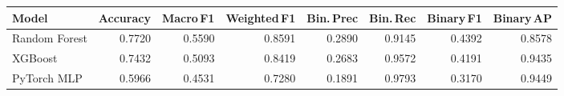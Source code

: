 \begin{tabular}{lrrrrrrr}
  \toprule
  Model & Accuracy & Macro\,F1 & Weighted\,F1 & Bin.\,Prec & Bin.\,Rec & Binary\,F1 & Binary\,AP \\
  \midrule
  Random Forest & 0.7720 & 0.5590 & 0.8591 & 0.2890 & 0.9145 & 0.4392 & 0.8578 \\
  XGBoost & 0.7432 & 0.5093 & 0.8419 & 0.2683 & 0.9572 & 0.4191 & 0.9435 \\
  PyTorch MLP & 0.5966 & 0.4531 & 0.7280 & 0.1891 & 0.9793 & 0.3170 & 0.9449 \\
  \bottomrule
\end{tabular}
